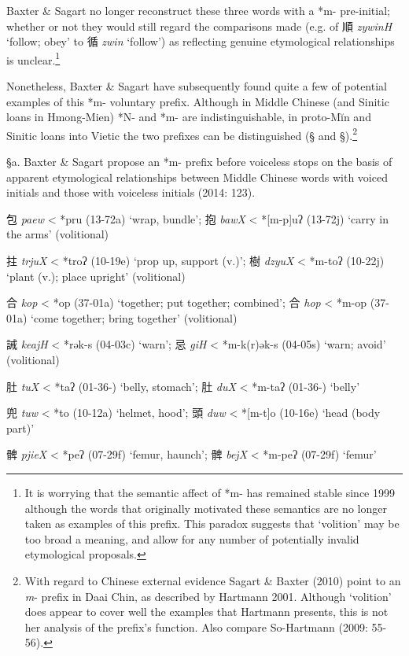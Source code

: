 Baxter \& Sagart no longer reconstruct these three words with a *m-
pre-initial; whether or not they would still regard the comparisons made
(e.g. of 順 \emph{zywinH} `follow; obey' to 循  \emph{zwin} `follow') as
reflecting genuine etymological relationships is unclear.\footnote{It is
  worrying that the semantic affect of *m- has remained stable since
  1999 although the words that originally motivated these semantics are
  no longer taken as examples of this prefix. This paradox suggests that
  `volition' may be too broad a meaning, and allow for any number of
  potentially invalid etymological proposals.}

Nonetheless, Baxter \& Sagart have subsequently found quite a few of
potential examples of this *m- voluntary prefix. Although in Middle
Chinese (and Sinitic loans in Hmong-Mien) *N- and *m- are
indistinguishable, in proto-Mĭn and Sinitic loans into Vietic the two
prefixes can be distinguished (§ and §).\footnote{With regard to Chinese
  external evidence Sagart \& Baxter (2010) point to an \emph{m}- prefix
  in Daai Chin, as described by Hartmann 2001. Although `volition' does
  appear to cover well the examples that Hartmann presents, this is not
  her analysis of the prefix's function. Also compare So-Hartmann (2009:
  55-56).}

§a. Baxter \& Sagart propose an *m- prefix before voiceless stops on the
basis of apparent etymological relationships between Middle Chinese
words with voiced initials and those with voiceless initials (2014:
123).

\begin{description} \item
包 \emph{paew} \textless{} *p{}ru (13-72a) `wrap, bundle'; 抱  \emph{bawX}
\textless{} *[m-p]{}uʔ (13-72j) `carry in the arms' (volitional)

\item
拄 \emph{trjuX} \textless{} *troʔ (10-19e) `prop up, support (v.)'; 樹
 \emph{dzyuX} \textless{} *m-toʔ (10-22j) `plant (v.); place upright'
(volitional)

\item
合 \emph{kop} \textless{} *{}op (37-01a) `together; put together;
combined'; 合 \emph{hop} \textless{} *m-{}op (37-01a) `come together;
bring together' (volitional)

\item
誡  \emph{keajH} \textless{} *{}rək-s (04-03c) `warn'; 忌 \emph{giH}
\textless{} *m-k(r)ək-s (04-05s) `warn; avoid' (volitional)

\item
肚  \emph{tuX} \textless{} *t{}aʔ (01-36-) `belly, stomach'; 肚 \emph{duX}
\textless{} *m-t{}aʔ (01-36-) `belly'

\item
兜  \emph{tuw} \textless{} *t{}o (10-12a) `helmet, hood'; 頭 \emph{duw}
\textless{} *[m-t]{}o (10-16e) `head (body part)'

\item
髀  \emph{pjieX} \textless{} *peʔ (07-29f) `femur, haunch'; 髀
 \emph{bejX} \textless{} *m-p{}eʔ (07-29f) `femur'
\end{description}

